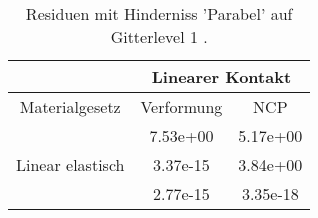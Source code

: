 \begin{table} 
\centering 
\begin{tabular}{c|cc|} 
\cline{2-3} 
 & \multicolumn{2}{|c|}{Linearer Kontakt} \\ 
\hline 
\multicolumn{1}{|c|}{Materialgesetz} & \multicolumn{1}{c|}{Verformung} & \multicolumn{1}{c|}{NCP} \\ 
\hline 
\multicolumn{1}{|c|}{\multirow{3}{*}{Linear elastisch}} &\multicolumn{1}{|c|}{  7.53e+00} & \multicolumn{1}{|c|}{  5.17e+00} \\ 
\multicolumn{1}{|c|}{} & \multicolumn{1}{|c|}{  3.37e-15} & \multicolumn{1}{|c|}{  3.84e+00} \\ 
\multicolumn{1}{|c|}{} & \multicolumn{1}{|c|}{  2.77e-15} & \multicolumn{1}{|c|}{  3.35e-18} \\ 
\hline 
\end{tabular}\caption{Residuen mit Hinderniss 'Parabel' auf Gitterlevel 1 .}\label{tab:Residuum_Parabel_level1}
\end{table} 
